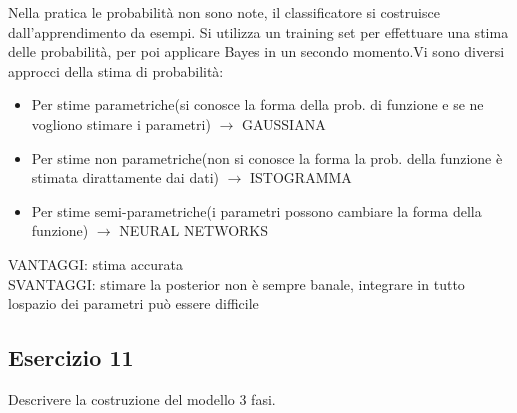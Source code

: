 \documentclass{article}
\begin{document}
Nella pratica le probabilità non sono note, il classificatore si costruisce dall'apprendimento da esempi. Si utilizza un training set per effettuare una stima delle probabilità, per poi applicare Bayes in un 
secondo momento.Vi sono diversi approcci della stima di probabilità:
\begin{itemize}
    \item Per stime parametriche(si conosce la forma della prob. di funzione e se ne vogliono stimare i parametri) $\rightarrow$ GAUSSIANA
    \item Per stime non parametriche(non si conosce la forma la prob. della funzione è stimata dirattamente dai dati) $\rightarrow$ ISTOGRAMMA
    \item Per stime semi-parametriche(i parametri possono cambiare la forma della funzione) $\rightarrow$ NEURAL NETWORKS
\end{itemize}
VANTAGGI: stima accurata\\
SVANTAGGI: stimare la posterior non è sempre banale, integrare in tutto lospazio dei parametri può essere difficile

\subsection*{Esercizio 11}
Descrivere la costruzione del modello 3 fasi.
\end{document}
